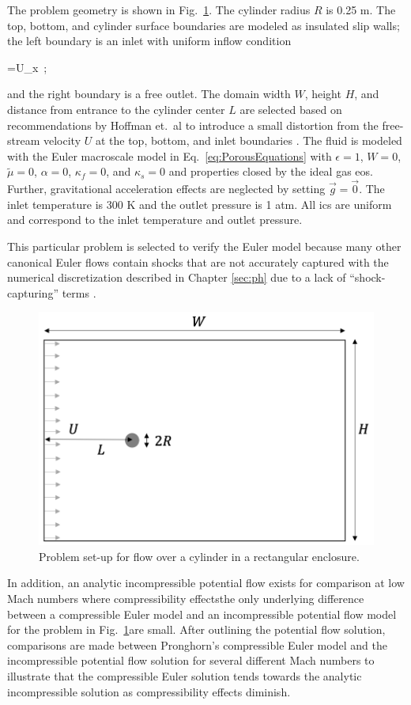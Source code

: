 The problem geometry is shown in Fig.\ \ref{fig:pf_geometry}. The cylinder radius \(R\) is 0.25 \si{\meter}. The top, bottom, and cylinder surface boundaries are modeled as insulated slip walls; the left boundary is an inlet with uniform inflow condition

\beq
\label{eq:FreeStreamV}
=U_x\ ;
\eeq

\noindent and the right boundary is a free outlet. The domain width \(W\), height \(H\), and distance from entrance to the cylinder center \(L\) are selected based on recommendations by Hoffman et.\ al to introduce a small distortion from the free-stream velocity \(U\) at the top, bottom, and inlet boundaries \cite{hoffman_2011}. The fluid is modeled with the Euler macroscale model in Eq.\ \eqref{eq:PorousEquations} with \(\epsilon=1\), \(W=0\), \(\tilde{\mu}=0\), \(\alpha=0\), \(\kappa_f=0\), and \(\kappa_s=0\) and properties closed by the ideal gas \gls{eos}. Further, gravitational acceleration effects are neglected by setting \(\vec{g}=\vec{0}\). The inlet temperature is 300 \si{\kelvin} and the outlet pressure is 1 atm. All \glspl{ic} are uniform and correspond to the inlet temperature and outlet pressure.

This particular problem is selected to verify the Euler model because many other canonical Euler flows contain shocks that are not accurately captured with the numerical discretization described in Chapter \ref{sec:ph} due to a lack of ``shock-capturing'' terms \cite{hughes_1986,tezduyar_1986}.

\begin{figure}[!h]
\centering
\includegraphics[width=0.5\linewidth]{figs/pf_geometry.png}
\caption{Problem set-up for flow over a cylinder in a rectangular enclosure.}
\label{fig:pf_geometry}
\end{figure}

In addition, an analytic incompressible potential flow exists for comparison at low Mach numbers where compressibility effects\mdash the only underlying difference between a compressible Euler model and an incompressible potential flow model for the problem in Fig.\ \ref{fig:pf_geometry}\mdash are small. After outlining the potential flow solution, comparisons are made between Pronghorn's compressible Euler model and the incompressible potential flow solution for several different Mach numbers to illustrate that the compressible Euler solution tends towards the analytic incompressible solution as compressibility effects diminish.

